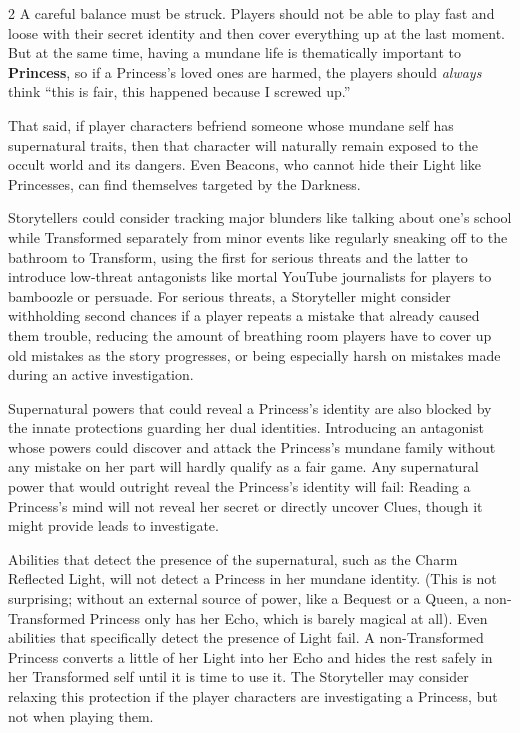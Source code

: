 \begin{multicols}{2}
A careful balance must be struck. Players should not be able to play fast and loose with their secret identity and then cover everything up at the last moment. But at the same time, having a mundane life is thematically important to \textbf{Princess}, so if a Princess's loved ones are harmed, the players should \textit{always} think “this is fair, this happened because I screwed up.” 

That said, if player characters befriend someone whose mundane self has supernatural traits, then that character will naturally remain exposed to the occult world and its dangers. Even Beacons, who cannot hide their Light like Princesses, can find themselves targeted by the Darkness.

Storytellers could consider tracking major blunders like talking about one's school while Transformed separately from minor events like regularly sneaking off to the bathroom to Transform, using the first for serious threats and the latter to introduce low-threat antagonists like mortal YouTube journalists for players to bamboozle or persuade. For serious threats, a Storyteller might consider withholding second chances if a player repeats a mistake that already caused them trouble, reducing the amount of breathing room players have to cover up old mistakes as the story progresses, or being especially harsh on mistakes made during an active investigation. 

Supernatural powers that could reveal a Princess's identity are also blocked by the innate protections guarding her dual identities. Introducing an antagonist whose powers could discover and attack the Princess's mundane family without any mistake on her part will hardly qualify as a fair game. Any supernatural power that would outright reveal the Princess's identity will fail: Reading a Princess's mind will not reveal her secret or directly uncover Clues, though it might provide leads to investigate. 

Abilities that detect the presence of the supernatural, such as the Charm Reflected Light, will not detect a Princess in her mundane identity. (This is not surprising; without an external source of power, like a Bequest or a Queen, a non-Transformed Princess only has her Echo, which is barely magical at all). Even abilities that specifically detect the presence of Light fail. A non-Transformed Princess converts a little of her Light into her Echo and hides the rest safely in her Transformed self until it is time to use it. The Storyteller may consider relaxing this protection if the player characters are investigating a Princess, but not when playing them. 


\end{multicols}
